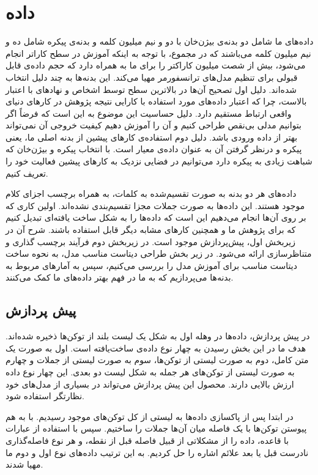 \section{داده‌}
\hspace{30pt}
داده‌های ما شامل دو بدنه‌ی بیژن‌خان\cite{bijankhan} با دو و نیم میلیون کلمه و بدنه‌ی پیکره\cite{peykareh} شامل ده و نیم میلیون کلمه می‌باشند که در مجموع، با توجه به اینکه آموزش در سطح کاراتر انجام می‌شود، بیش از شصت میلیون کاراکتر را برای ما به همراه دارد که حجم داده‌ی قابل قبولی برای تنظیم مدل‌های ترانسفورمر مهیا می‌کند. این بدنه‌ها به چند دلیل انتخاب شده‌اند. دلیل اول تصحیح آن‌ها در بالاترین سطح توسط اشخاص و نهاد‌های با اعتبار بالاست، چرا که اعتبار داده‌های مورد استفاده با کارایی نتیجه پژوهش در کار‌های دنیای واقعی ارتباط مستقیم دارد. دلیل حساسیت این موضوع به این است که فرضاً اگر بتوانیم مدلی بی‌نقص طراحی کنیم و آن را آموزش دهیم کیفیت خروجی آن نمی‌تواند بهتر از داده ورودی باشد. دلیل دوم استفاده‌ی کار‌های پیشین از بدنه اصلی ما، یعنی پیکره و درنظر گرفتن آن به عنوان داده‌ی معیار است. با انتخاب پیکره و بیژن‌خان که شباهت زیادی به پیکره دارد می‌توانیم در فضایی نزدیک به کار‌های پیشین فعالیت خود را تعریف کنیم.

داده‌های هر دو بدنه به صورت تقسیم‌شده به کلمات، به همراه برچسب اجزای کلام موجود هستند. این داده‌ها به صورت جملات مجزا تقسیم‌بندی نشده‌اند. اولین کاری که بر روی آن‌ها انجام می‌دهیم این است که داده‌ها را به شکل‌ ساخت یافته‌ای تبدیل کنیم که برای پژوهش ما و همچنین کارهای مشابه دیگر قابل استفاده باشند. شرح آن در زیربخش اول، پیش‌پردازش موجود است. در زیربخش دوم فرآیند برچسب گذاری و متناظر‌سازی ارائه می‌شود. در زیر بخش طراحی دیتاست مناسب مدل، به‌ نحوه ساخت دیتاست مناسب برای آموزش مدل را بررسی می‌کنیم، سپس به آمارهای مربوط به بدنه‌ها می‌پردازیم که به ما در فهم بهتر داده‌های ما کمک می‌کنند.
\subsection{پیش پردازش}
\hspace{30pt}
در پیش پردازش، داده‌ها در وهله اول به شکل یک لیست بلند از توکن‌ها ذخیره شده‌اند. هدف ما در این بخش رسیدن به چهار نوع داده‌ی ساخت‌یافته است. اول به صورت یک متن کامل، دوم به صورت لیستی از توکن‌ها، سوم به صورت لیستی از جملات و چهارم به صورت لیستی از توکن‌های هر جمله به شکل لیست دو بعدی. این چهار نوع داده ارزش بالایی دارند. محصول این پیش پردازش می‌تواند در بسیاری از مدل‌های خود نظارتگر استفاده شود.

در ابتدا پس از پاکسازی داده‌ها به لیستی از کل توکن‌های موجود رسیدیم. با به هم پیوستن توکن‌ها با یک فاصله میان آن‌ها جملات را ساختیم. سپس با استفاده از عبارات با قاعده، داده را از مشکلاتی از قبیل فاصله قبل از نقطه، و هر نوع فاصله‌گذاری نادرست قبل یا بعد علائم اشاره را حل کردیم. به این ترتیب داده‌های نوع اول و دوم ما مهیا شدند.

